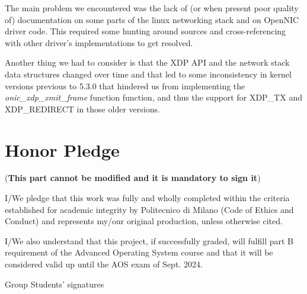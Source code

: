 \documentclass[10pt,a4]{article}
\begin{document}
The main problem we encountered was the lack of (or when present
poor quality of) documentation on some parts of the linux networking stack and
on OpenNIC driver code. This required some hunting around sources and
cross-referencing with other driver's implementations to get resolved. 


Another thing we had to consider is that the XDP API and the network stack data structures changed 
over time and that led to some inconsistency in kernel versions previous to 5.3.0 that hindered us from
implementing the \textit{onic\_xdp\_xmit\_frame} function function, and thus the support for XDP\_TX and XDP\_REDIRECT in those older versions.  

\section{Honor Pledge}
(\textbf{This part cannot be modified and it is mandatory to sign it})

I/We pledge that this work was fully and wholly completed within the criteria
established for academic integrity by Politecnico di Milano (Code of Ethics and
Conduct) and represents my/our original production, unless otherwise cited.

I/We also understand that this project, if successfully graded,  will fulfill part B requirement of the
Advanced Operating System course and that it will be considered valid up until
the AOS exam of Sept. 2024.

\begin{flushright}
Group Students' signatures
\end{flushright}
\end{document}

